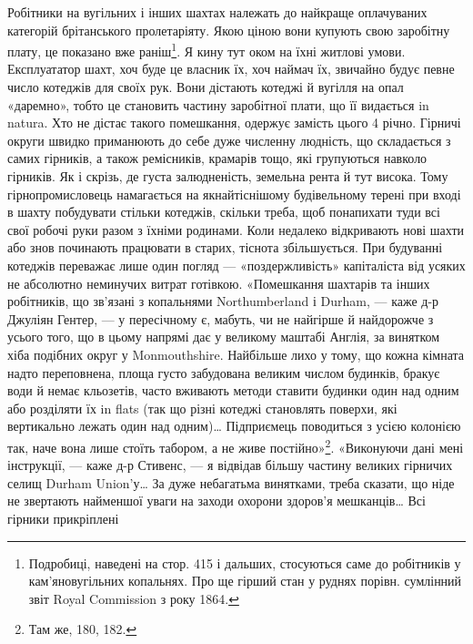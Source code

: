 Робітники на вугільних і інших шахтах належать до найкраще
оплачуваних категорій брітанського пролетаріяту. Якою ціною
вони купують свою заробітну плату, це показано вже раніш\footnote{
Подробиці, наведені на стор. 415 і дальших, стосуються саме до
робітників у кам'яновугільних копальнях. Про ще гірший стан у руднях
порівн. сумлінний звіт Royal Commission з року 1864.
}.
Я кину тут оком на їхні житлові умови. Експлуататор шахт,
хоч буде це власник їх, хоч наймач їх, звичайно будує певне
число котеджів для своїх рук. Вони дістають котеджі й вугілля
на опал «даремно», тобто це становить частину заробітної плати,
що її видається in natura. Хто не дістає такого помешкання,
одержує замість цього 4 річно. Гірничі округи
швидко приманюють до себе дуже численну людність, що складається
з самих гірників, а також ремісників, крамарів тощо,
які групуються навколо гірників. Як і скрізь, де густа залюдненість,
земельна рента й тут висока. Тому гірнопромисловець
намагається на якнайтіснішому будівельному терені при вході
в шахту побудувати стільки котеджів, скільки треба, щоб понапихати
туди всі свої робочі руки разом з їхніми родинами.
Коли недалеко відкривають нові шахти або знов починають
працювати в старих, тіснота збільшується. При будуванні котеджів
переважає лише один погляд — «поздержливість» капіталіста
від усяких не абсолютно неминучих витрат готівкою.
«Помешкання шахтарів та інших робітників, що зв’язані з копальнями
Northumberland і Durham, — каже д-р Джуліян Гентер,
— у пересічному є, мабуть, чи не найгірше й найдорожче
з усього того, що в цьому напрямі дає у великому маштабі
Англія, за винятком хіба подібних округ у Monmouthshire. Найбільше
лихо у тому, що кожна кімната надто переповнена, площа
густо забудована великим числом будинків, бракує води й
немає кльозетів, часто вживають методи ставити будинки один
над одним або розділяти їх in flats (так що різні котеджі становлять
поверхи, які вертикально лежать один над одним)\dots{} Підприємець
поводиться з усією колонією так, наче вона лише стоїть
табором, а не живе постійно»\footnote{
Там же, \stor{}180, 182.
}. «Виконуючи дані мені інструкції,
— каже д-р Стивенс, — я відвідав більшу частину великих
гірничих селищ Durham Union’у\dots{} За дуже небагатьма винятками,
треба сказати, що ніде не звертають найменшої уваги на
заходи охорони здоров’я мешканців\dots{} Всі гірники прикріплені
\parbreak{}  %
